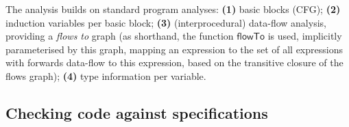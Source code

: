 \newcommand{\neigh}{\textsf{neigh}}

The analysis builds on standard program analyses:
%
\textbf{(1)} basic blocks (CFG);
\textbf{(2)} induction variables per basic block;
\textbf{(3)} (interprocedural) data-flow analysis, providing a \emph{flows to}
  graph (as shorthand, the function
  $\mathsf{flowTo}$ is used, implicitly parameterised by this graph,
  mapping an expression to the set of all expressions
  with forwards data-flow to this expression, based on the transitive
  closure of the flows graph);
\textbf{(4)} type information per variable.%


\subsection{Checking code against specifications}
\label{subsec:checking}

